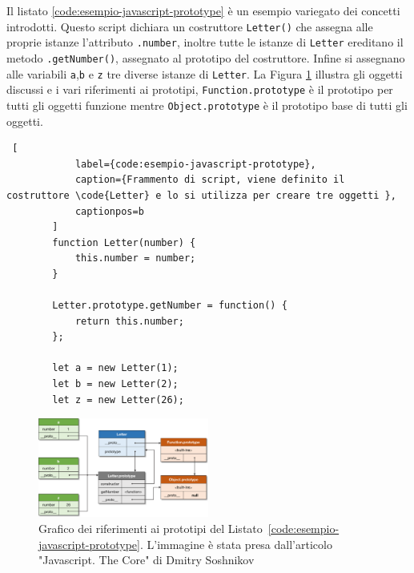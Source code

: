 \documentclass{sapthesis}
\newcommand{\code}[1]{\texttt{#1}}
\newcommand{\method}[1]{\code{.#1()}}
\newcommand{\attr}[1]{\code{.#1}}
\newcommand{\refCode}[1]{Listato~\ref{#1}}
\begin{document}
        Il listato \ref{code:esempio-javascript-prototype} è un esempio variegato dei concetti introdotti.
        Questo script dichiara un costruttore \code{Letter()} che assegna alle proprie istanze l'attributo \attr{number},
        inoltre tutte le istanze di \code{Letter} ereditano il metodo \method{getNumber}, assegnato al prototipo del costruttore.
        Infine si assegnano alle variabili \code{a},\code{b} e \code{z} tre diverse istanze di \code{Letter}.
        La Figura \ref{fig:javascript-prototype} illustra gli oggetti discussi e i vari riferimenti ai prototipi, \code{Function.prototype}
        è il prototipo per tutti gli oggetti funzione mentre \code{Object.prototype} è il prototipo base di tutti gli oggetti.

        \begin{lstlisting} [
            label={code:esempio-javascript-prototype},
            caption={Frammento di script, viene definito il costruttore \code{Letter} e lo si utilizza per creare tre oggetti },
            captionpos=b
        ]
        function Letter(number) {
            this.number = number;
        }
        
        Letter.prototype.getNumber = function() {
            return this.number;
        };
        
        let a = new Letter(1);
        let b = new Letter(2);
        let z = new Letter(26);
        \end{lstlisting}
        
        \begin{figure}[ht]
            \centering                                                  
            \includegraphics[width=0.5\textwidth]{javascript-constructor.png}
            \caption{Grafico dei riferimenti ai prototipi del \refCode{code:esempio-javascript-prototype}. L'immagine è stata presa dall'articolo "Javascript. The Core" di  Dmitry Soshnikov \cite{javascript-core}}
            \label{fig:javascript-prototype}  
        \end{figure}
\end{document}
